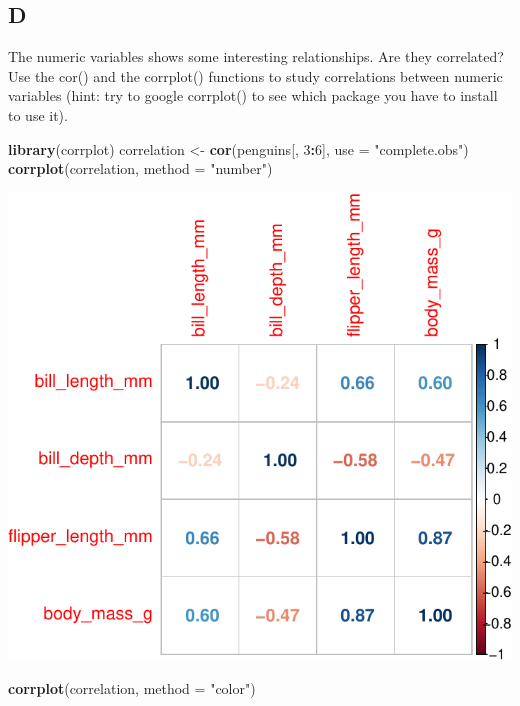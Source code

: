 \documentclass[
]{article}
\newenvironment{Shaded}{\begin{snugshade}}{\end{snugshade}}
\newcommand{\AttributeTok}[1]{\textcolor[rgb]{0.13,0.29,0.53}{#1}}
\newcommand{\DecValTok}[1]{\textcolor[rgb]{0.00,0.00,0.81}{#1}}
\newcommand{\FunctionTok}[1]{\textcolor[rgb]{0.13,0.29,0.53}{\textbf{#1}}}
\newcommand{\NormalTok}[1]{#1}
\newcommand{\OtherTok}[1]{\textcolor[rgb]{0.56,0.35,0.01}{#1}}
\newcommand{\SpecialCharTok}[1]{\textcolor[rgb]{0.81,0.36,0.00}{\textbf{#1}}}
\newcommand{\StringTok}[1]{\textcolor[rgb]{0.31,0.60,0.02}{#1}}
\begin{document}
\hypertarget{d-3}{%
\subsection{D}\label{d-3}}

The numeric variables shows some interesting relationships. Are they
correlated? Use the cor() and the corrplot() functions to study
correlations between numeric variables (hint: try to google corrplot()
to see which package you have to install to use it).

\begin{Shaded}
\begin{Highlighting}[]
\FunctionTok{library}\NormalTok{(corrplot)}
\NormalTok{correlation }\OtherTok{\textless{}{-}} \FunctionTok{cor}\NormalTok{(penguins[, }\DecValTok{3}\SpecialCharTok{:}\DecValTok{6}\NormalTok{], }\AttributeTok{use =} \StringTok{"complete.obs"}\NormalTok{)}
\FunctionTok{corrplot}\NormalTok{(correlation, }\AttributeTok{method =} \StringTok{"number"}\NormalTok{)}
\end{Highlighting}
\end{Shaded}

\includegraphics{es_files/figure-latex/unnamed-chunk-20-1.pdf}

\begin{Shaded}
\begin{Highlighting}[]
\FunctionTok{corrplot}\NormalTok{(correlation, }\AttributeTok{method =} \StringTok{"color"}\NormalTok{)}
\end{Highlighting}
\end{Shaded}
\end{document}
